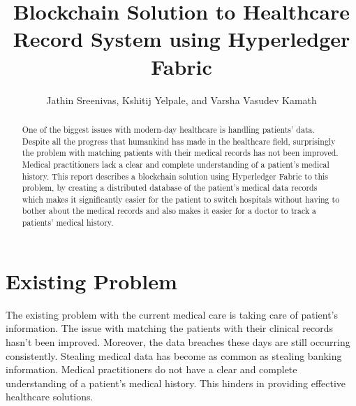 \documentclass[journal,12pt,onecolumn]{IEEEtran}
\begin{document}
\title{Blockchain Solution to Healthcare Record System using Hyperledger Fabric}

\author{Jathin Sreenivas,
        Kshitij Yelpale,
        and Varsha Vasudev Kamath}

\maketitle
\begin{abstract}
    One of the biggest issues with modern-day healthcare is handling patients’ data. Despite all the progress that humankind has made in the healthcare field, surprisingly the problem with matching patients with their medical records has not been improved. Medical practitioners lack a clear and complete understanding of a patient’s medical history. This report describes a blockchain solution using Hyperledger Fabric\cite{b3} to this problem, by creating a distributed database of the patient's medical data records which makes it significantly easier for the patient to switch hospitals without having to bother about the medical records and also makes it easier for a doctor to track a patients' medical history.  \end{abstract}




\section{Existing Problem}
The existing problem with the current medical care is taking care of patient's information. The issue with matching the patients with their clinical records hasn't been improved. Moreover, the data breaches these days are still occurring consistently. Stealing medical data has become as common as stealing banking information. Medical practitioners do not have a clear and complete understanding of a patient’s medical history. This hinders in providing effective healthcare solutions.
\end{document}
